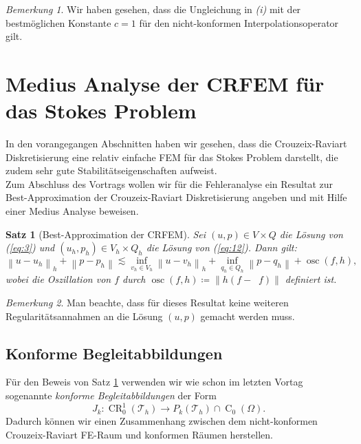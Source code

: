 \documentclass[a4paper]{scrartcl}
\newcommand{\crfem}{\operatorname{CR}_0^1}
\newcommand{\czero}{\operatorname{C}_0}
\newcommand{\mesh}{\mathcal{T}_h}
\newcommand{\norm}[1]{\left\lVert#1\right\rVert}
\newcommand{\hnorm}[1]{\left\lVert#1\right\rVert_h}
\newcommand{\black}{\color{black}}
\newcommand{\blue}{\color{blue}}
\DeclareMathOperator{\intOp}{I_{NC}}
\DeclareMathOperator{\LtwoOp}{\Pi_0}
\DeclareMathOperator{\osc}{osc}
\theoremstyle{plain}
\newtheorem{theorem}{Satz}
\theoremstyle{definition}
\theoremstyle{remark}
\newtheorem*{remark*}{Bemerkung}
\begin{document}
\begin{remark*}
  Wir haben gesehen, dass die Ungleichung in \emph{(i)} mit der
  bestmöglichen Konstante \(c=1\) für den nicht-konformen
  Interpolationsoperator \(\intOp\) gilt. 
\end{remark*}



\section{Medius Analyse der CRFEM für das Stokes Problem}
\label{sec:medius-analyse-der}

\blue
In den vorangegangen Abschnitten haben wir gesehen, dass die
Crouzeix-Raviart Diskretisierung eine relativ einfache FEM für das
Stokes Problem darstellt, die zudem sehr gute Stabilitätseigenschaften
aufweist. \\
Zum Abschluss des Vortrags wollen wir für die Fehleranalyse ein
Resultat zur Best-Approximation der Crouzeix-Raviart Diskretisierung
angeben und mit Hilfe einer Medius Analyse beweisen. 

\black
\begin{theorem}[Best-Approximation der CRFEM]\label{thm:4}
  Sei \((u,p) \in V\times Q\) die Lösung von (\ref{eq:3}) und
  \((u_h,p_h) \in  V_h\times Q_h\) die Lösung von (\ref{eq:12}). Dann
  gilt: 
  \begin{equation}
    \label{eq:19}
    \hnorm{u - u_h} + \norm{p - p_h} \lesssim \inf_{v_h \in V_h} \hnorm{u - v_h} + \inf_{q_h \in Q_h} \norm{p - q_h} + \osc(f,h), 
  \end{equation}
  wobei die Oszillation von \(f\) durch  \(\osc(f, h) \coloneqq
  \norm{h(f - \LtwoOp f)}\) definiert ist. 
\end{theorem}

\begin{remark*}
  Man beachte, dass für dieses Resultat keine weiteren
  Regularitätsannahmen an die Lösung \((u,p)\) gemacht werden muss. 
\end{remark*}

\subsection{Konforme Begleitabbildungen}
\label{sec:konf-begl}

\blue
Für den Beweis von Satz \ref{thm:4} verwenden wir wie schon im
letzten Vortag sogenannte \emph{konforme Begleitabbildungen} der Form 
\[ J_k \colon \crfem(\mesh) \rightarrow
P_k(\mesh)\cap\czero(\Omega).\] 
Dadurch können wir einen Zusammenhang zwischen dem nicht-konformen
Crouzeix-Raviart FE-Raum und konformen Räumen herstellen. \\
\end{document}
